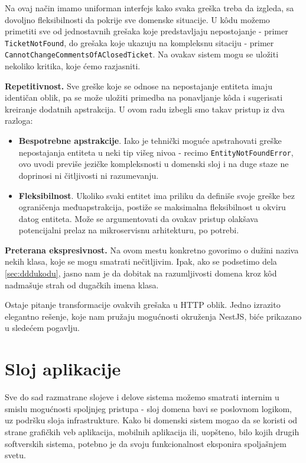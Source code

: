 \documentclass[12pt,oneside]{memoir}
\begin{document}
Na ovaj način imamo uniforman interfejs kako svaka greška treba da izgleda, sa dovoljno fleksibilnosti da pokrije sve domenske situacije. U k\^{o}du možemo primetiti sve od jednostavnih grešaka koje predstavljaju nepostojanje - primer \verb|TicketNotFound|, do grešaka koje ukazuju na kompleksnu sitaciju - primer \verb|CannotChangeCommentsOfAClosedTicket|. Na ovakav sistem mogu se uložiti nekoliko kritika, koje ćemo razjasniti.

\textbf{Repetitivnost.}  
Sve greške koje se odnose na nepostajanje entiteta imaju identičan oblik, pa se može uložiti primedba na ponavljanje k\^{o}da i sugerisati kreiranje dodatnih apstrakcija. U ovom radu izbegli smo takav pristup iz dva razloga:
\begin{itemize}
    \item \textbf{Bespotrebne apstrakcije}. Iako je tehnički moguće apstrahovati greške nepostajanja entiteta u neki tip višeg nivoa - recimo \verb|EntityNotFoundError|, ovo uvodi previše jezičke kompleksnosti u domenski sloj i na duge staze ne doprinosi ni čitljivosti ni razumevanju.
    \item \textbf{Fleksibilnost}. Ukoliko svaki entitet ima priliku da definiše svoje greške bez ograničenja međuapstrakcija, postiže se maksimalna fleksibilnost u okviru datog entiteta. Može se argumentovati da ovakav pristup olakšava potencijalni prelaz na mikroservisnu arhitekturu, po potrebi.
\end{itemize}


\textbf{Preterana ekspresivnost.} Na ovom mestu konkretno govorimo o dužini naziva nekih klasa, koje se mogu smatrati nečitljivim. Ipak, ako se podsetimo dela \ref{sec:dddukodu}, jasno nam je da dobitak na razumljivosti domena kroz k\^{o}d nadmašuje strah od dugačkih imena klasa.


Ostaje pitanje transformacije ovakvih grešaka u HTTP oblik. Jedno izrazito elegantno rešenje, koje nam pružaju mogućnosti okruženja NestJS, biće prikazano u sledećem pogavlju.

\section{Sloj aplikacije}

Sve do sad razmatrane slojeve i delove sistema možemo smatrati internim u smislu mogućnosti spoljnjeg pristupa - sloj domena bavi se poslovnom logikom, uz podršku sloja infrastrukture. Kako bi domenski sistem mogao da se koristi od strane grafičkih veb aplikacija, mobilnih aplikacija ili, uopšteno, bilo kojih drugih softverskih sistema, potebno je da svoju funkcionalnost eksponira spoljašnjem svetu. 
\end{document}
